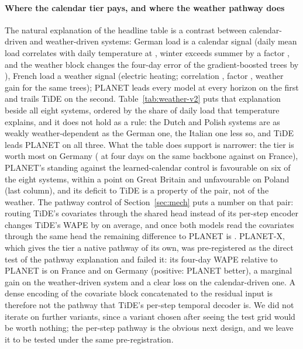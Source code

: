\paragraph{Where the calendar tier pays, and where the weather pathway does}
The natural explanation of the headline table is a contrast between
calendar-driven and weather-driven systems: German load is a calendar signal (daily mean load
correlates with daily temperature at , winter exceeds summer by a
factor , and the weather block changes the four-day error of
the gradient-boosted trees by ), French load a
weather signal (electric heating; correlation , factor
, weather gain 
for the same trees); PLANET leads every model at every horizon on the first and trails TiDE on
the second. Table~\ref{tab:weather-v2} puts that explanation beside all eight systems, ordered
by the share of daily load that temperature explains, and it does not hold as a rule: the Dutch
and Polish systems are as weakly weather-dependent as the German one, the Italian one less so,
and TiDE leads PLANET on all three. What the
table does support is narrower: the tier is worth most on Germany
( at four days on the same backbone against
 on France), PLANET's standing against the
learned-calendar control is favourable on six of the eight systems, within a point on Great Britain and unfavourable
on Poland (last column), and its deficit to TiDE is a property of the pair, not of the weather. The pathway control of Section~\ref{sec:mech}
puts a number on that pair: routing TiDE's covariates through the shared head instead of its
per-step encoder changes TiDE's WAPE by  on
average, and once both models read the covariates through the same head the remaining
difference to PLANET is . PLANET-X, which gives
the tier a native pathway of its own, was pre-registered as the direct test of the pathway
explanation and failed it: its four-day WAPE relative to PLANET is
 on France and
 on Germany (positive: PLANET better), a marginal
gain on the weather-driven system and a clear loss on the calendar-driven one. A dense encoding
of the covariate block concatenated to the residual input is therefore not the pathway that
TiDE's per-step temporal decoder is. We did not iterate on further variants, since a variant
chosen after seeing the test grid would be worth nothing; the per-step pathway is the obvious
next design, and we leave it to be tested under the same pre-registration.

